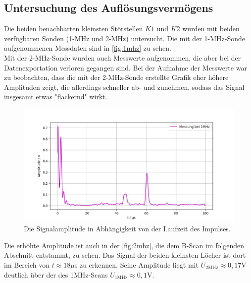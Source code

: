 \subsection{Untersuchung des Auflösungsvermögens}
Die beiden benachbarten kleinsten Störstellen $K1$ und $K2$ wurden mit beiden verfügbaren
Sonden (1-MHz und 2-MHz) untersucht. Die mit der 1-MHz-Sonde aufgenommenen Messdaten sind in \autoref{fig:1mhz} zu sehen.\\
Mit der 2-MHz-Sonde wurden auch Messwerte aufgenommen, die aber bei der Datenexportation verloren gegangen sind. 
Bei der Aufnahme der Messwerte war zu beobachten, dass die mit der 2-MHz-Sonde erstellte Grafik eher höhere 
Amplituden zeigt, die allerdings schneller ab- und zunehmen, sodass das Signal insgesamt etwas "flackernd"  wirkt.
\begin{figure}[H]
  \centering
  \includegraphics[width = \textwidth]{content/1mhz_aufl_plot.png}
  \caption{Die Signalamplitude in Abhängigkeit von der Laufzeit des Impulses.}
  \label{fig:1mhz}
\end{figure}
Die erhöhte Amplitude ist auch in der \autoref{fig:2mhz}, die dem B-Scan im folgenden Abschnitt entstammt, zu sehen. Das Signal der beiden kleinsten Löcher 
ist dort im Bereich von $t \approx 18\mu$s zu erkennen. 
Seine Amplitude liegt mit $U_{\mathrm{2MHz}} \approx 0,17$V deutlich über der des 1MHz-Scans $U_{\mathrm{1MHz}} \approx 0,1$V.




